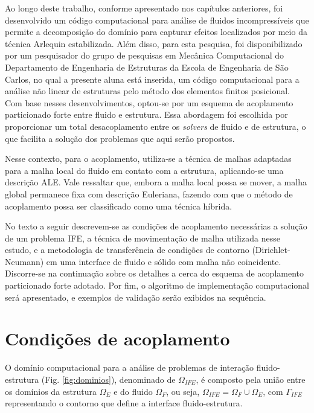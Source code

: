 \documentclass[tese_patricia]{subfiles}
\begin{document}
Ao longo deste trabalho, conforme apresentado nos capítulos anteriores, foi desenvolvido um código computacional para análise de fluidos incompressíveis que permite a decomposição do domínio para capturar efeitos localizados por meio da técnica Arlequin estabilizada. Além disso, para esta pesquisa, foi disponibilizado por um pesquisador do grupo de pesquisas em Mecânica Computacional do Departamento de Engenharia de Estruturas da Escola de Engenharia de São Carlos, no qual a presente aluna está inserida, um código computacional para a análise não linear de estruturas pelo método dos elementos finitos posicional. Com base nesses desenvolvimentos, optou-se por um esquema de acoplamento particionado forte entre fluido e estrutura. Essa abordagem foi escolhida por proporcionar um total desacoplamento entre os \textit{solvers} de fluido e de estrutura, o que facilita a solução dos problemas que aqui serão propostos.

Nesse contexto, para o acoplamento, utiliza-se a técnica de malhas adaptadas para a malha local do fluido em contato com a estrutura, aplicando-se uma descrição ALE. Vale ressaltar que, embora a malha local possa se mover, a malha global permanece fixa com descrição Euleriana, fazendo com que o método de acoplamento possa ser classificado como uma técnica híbrida.
 
No texto a seguir descrevem-se as condições de acoplamento necessárias a solução de um problema IFE, a técnica de movimentação de malha utilizada nesse estudo, e a metodologia de transferência de condições de contorno (Dirichlet-Neumann) em uma interface de fluido e sólido com malha não coincidente. Discorre-se na continuação sobre os detalhes a cerca do esquema de acoplamento particionado forte adotado. Por fim, o algoritmo de implementação computacional será apresentado, e exemplos de validação serão exibidos na sequência.

\section{Condições de acoplamento}

O domínio computacional para a análise de problemas de interação fluido-estrutura (Fig. \ref{fig:dominios}), denominado de $\Omega_{IFE}$, é composto pela união entre os domínios da estrutura $\Omega_E$ e do fluido $\Omega_F$, ou seja, $\Omega_{IFE} = \Omega_F \cup \Omega_E$, com $\Gamma_{IFE}$ representando o contorno que define a interface fluido-estrutura.
\end{document}
